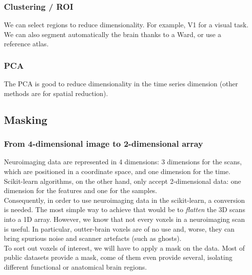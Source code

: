 \documentclass{frontiersSCNS} %
\newcommand{\alex}[1]{\todo[inline, color=green!40]{#1}}
\begin{document}
\subsubsection{Clustering / ROI}

We can select regions to reduce dimensionality. For example, V1 for a visual
task. We can also segment automatically the brain thanks to a Ward, or use a
reference atlas.

\subsubsection{PCA}

The PCA is good to reduce dimensionality in the time series dimension (other
methods are for spatial reduction).


\subsection{Masking}


\subsubsection{From 4-dimensional image to 2-dimensional array}

Neuroimaging data are represented in 4 dimensions: 3 dimensions for the scans,
which are positioned in a coordinate space, and one dimension for the time.
Scikit-learn algorithms, on the other hand, only accept 2-dimensional data: one
dimension for the features and one for the samples.\\

Consequently, in order to use neuroimaging data in the scikit-learn, a
conversion is needed. The most simple way to achieve that would be to
\emph{flatten} the 3D scans into a 1D array. However, we know that not every
voxels in a neuroimaging scan is useful. In particular, outter-brain voxels are
of no use and, worse, they can bring spurious noise and scanner artefacts (such
as ghosts).\\

To sort out voxels of interest, we will have to apply a mask on the data. Most
of public datasets provide a mask, come of them even provide several, isolating
different functional or anatomical brain regions. \alex{ref to Haxby}
\end{document}
